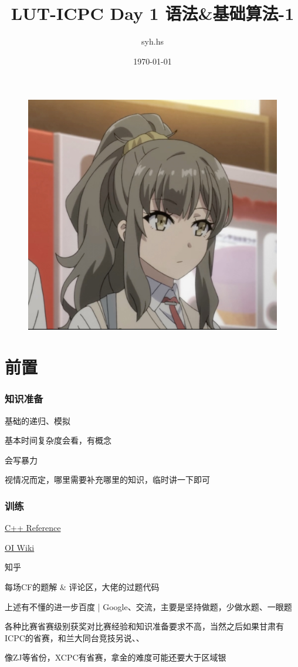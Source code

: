 \documentclass{beamer}
\author{syh.hs}
\title{LUT-ICPC Day 1 语法\&基础算法-1}
\date{\today}
\institute{兰州理工大学}
\begin{document}

  

  \begin{frame}[plain]
    \maketitle
    \begin{figure}[htbp] %
    \centering %
    \includegraphics[width=0.3\textheight,height=0.2\textwidth]{new- 2.jpg} %
    \end{figure}
  \end{frame}

  
  \section{前置}

  \begin{frame}
    \frametitle{知识准备}
    基础的递归、模拟

    基本时间复杂度会看，有概念

    会写暴力

    视情况而定，哪里需要补充哪里的知识，临时讲一下即可
  \end{frame}
  \begin{frame}
    \frametitle{训练}
    \href{https://en.cppreference.com/w/}{C++ Reference}

    \href{https://oi-wiki.org/}{OI Wiki}

    知乎

    每场CF的题解 \& 评论区，大佬的过题代码

    \vspace*{1\baselineskip}
    
    上述有不懂的进一步百度 | Google、交流，主要是坚持做题，少做水题、一眼题
    
    \vspace*{1\baselineskip}
    
    各种比赛省赛级别获奖对比赛经验和知识准备要求不高，当然之后如果甘肃有ICPC的省赛，和兰大同台竞技另说、、
    
    \vspace*{1\baselineskip}

    像ZJ等省份，XCPC有省赛，拿金的难度可能还要大于区域银
  \end{frame}
\end{document}

